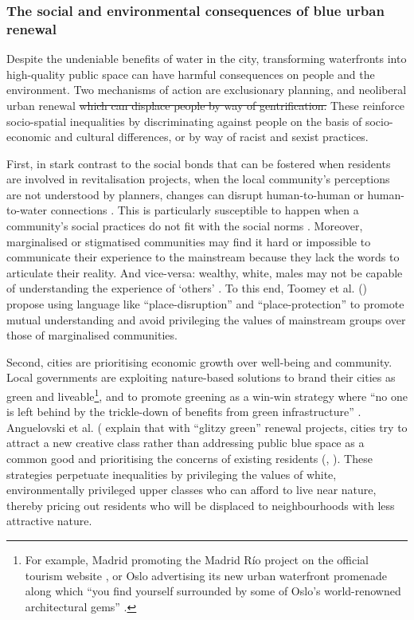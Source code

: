 \documentclass{article}
\begin{document}
\subsubsection{The social and environmental consequences of blue urban renewal}

Despite the undeniable benefits of water in the city, transforming waterfronts into high-quality public space can have harmful consequences on people and the environment.
Two mechanisms of action are exclusionary planning, and neoliberal urban renewal \sout{which can displace people by way of gentrification.} These reinforce socio-spatial inequalities by discriminating against people on the basis of socio-economic and cultural differences, or by way of racist and sexist practices.

First, in stark contrast to the social bonds that can be fostered when residents are involved in revitalisation projects, when the local community’s perceptions are not understood by planners, changes can disrupt human-to-human or human-to-water connections \parencite{toomey2021place}. This is particularly susceptible to happen when a community's social practices do not fit with the social norms \parencite{wessells2014urban}. 
Moreover, marginalised or stigmatised communities may find it hard or impossible to communicate their experience to the mainstream because they lack the words to articulate their reality. And vice-versa: wealthy, white, males may not be capable of understanding the experience of `others' \parencite{anguelovski2020expanding}. To this end, Toomey et al. (\citeyear{toomey2021place}) propose using language like ``place-disruption'' and ``place-protection'' to promote mutual understanding and avoid privileging the values of mainstream groups over those of marginalised communities.

Second, cities are prioritising economic growth over well-being and community. Local governments are exploiting nature-based solutions to brand their cities as green and liveable\footnote{For example, Madrid promoting the Madrid Río project on the official tourism website \parencite{madridrio}, or Oslo advertising its new urban waterfront promenade along which ``you find yourself surrounded by some of Oslo's world-renowned architectural gems'' \parencite{visitoslo}.}, and to promote greening as a win-win strategy where ``no one is left behind by the trickle-down of benefits from green infrastructure'' \parencite{anguelovski2021green}.
Anguelovski et al. (\citeyear{anguelovski2021green} explain that with ``glitzy green'' renewal projects, cities try to attract a new creative class rather than addressing public blue space as a common good and prioritising the concerns of existing residents (\cite{wessells2014urban}, \cite{anguelovski2020expanding}).
These strategies perpetuate inequalities by privileging the values of white, environmentally privileged upper classes who can afford to live near nature, thereby pricing out residents who will be displaced to neighbourhoods with less attractive nature.
\end{document}
